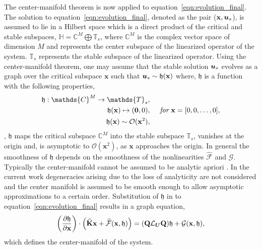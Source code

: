 The center-manifold theorem is now applied to equation~\eqref{eqn:evolution_final}. 	The solution to equation~\eqref{eqn:evolution_final}, denoted as the pair ($\mathbf{x},\boldsymbol{u}_{s}$), is assumed to lie in a Hilbert space which is a direct product of the critical and stable subspaces, $\mathds{H} = \mathds{C}^{M} \bigoplus \mathds{T}_{s}$, where $\mathds{C}^{M}$ is the complex vector space of dimension $M$ and represents the center subspace of the linearized operator of the system. $\mathds{T}_{s}$ represents the stable subspace of the linearized operator. 
%
Using the center-manifold theorem, one may assume that the stable solution $\boldsymbol{u}_{s}$ evolves as a graph over the critical subspace $\mathbf{x}$ such that $\boldsymbol{u}_{s} \sim \mathfrak{h}(\mathbf{x})$ where, $\mathfrak{h}$ is a function with the following properties,
\begin{eqnarray}
	\label{eqn:CM_approx_properties}
	\mathfrak{h}: \mathds{C}^{M} \to \mathds{T}_{s}, & \nonumber \\
	\mathfrak{h}(\mathbf{x}) \mapsto (\boldsymbol{0},\pfield{0}), & \hspace{5mm} \textit{for}\ \mathbf{x} = [0,0,\ldots,0] , \nonumber \\
	\mathfrak{h}(\mathbf{x}) \sim \mathcal{O}(\mathbf{x}^{2}), & \nonumber
\end{eqnarray}
\ie, $\mathfrak{h}$ maps the critical subspace $\mathds{C}^{M}$ into the stable subspace $\mathds{T}_{s}$, vanishes at the origin and, is asymptotic to $\mathcal{O}(\mathbf{x}^{2})$, as $\mathbf{x}$ approaches the origin. 
In general the smoothness of $\mathfrak{h}$ depends on the smoothness of the nonlinearities $\mathcal{\widehat{F}}$ and $\mathcal{G}$. Typically the center-manifold cannot be assumed to be analytic apriori \citep{carr82,sijbrand85}. In the current work degeneracies arising due to the loss of analyticity are not considered and the center manifold is assumed to be smooth enough to allow asymptotic approximations to a certain order. Substitution of $\mathfrak{h}$ in to equation~\eqref{eqn:evolution_final} results in a graph equation,
\begin{align}
	\label{eqn:graph_equation}
	\left(\frac{\partial \mathfrak{h}}{\partial \mathbf{x}}\right)\cdot \left(\mathbf{\widehat{K}}\mathbf{x} + \mathcal{\widehat{F}}(\mathbf{x},\mathfrak{h}) \right) = (\mathbf{Q}\mathcal{L}_{\boldsymbol{U}}\mathbf{Q})\mathfrak{h} + \mathcal{G}(\mathbf{x},\mathfrak{h}),
\end{align}
which defines the center-manifold of the system.

